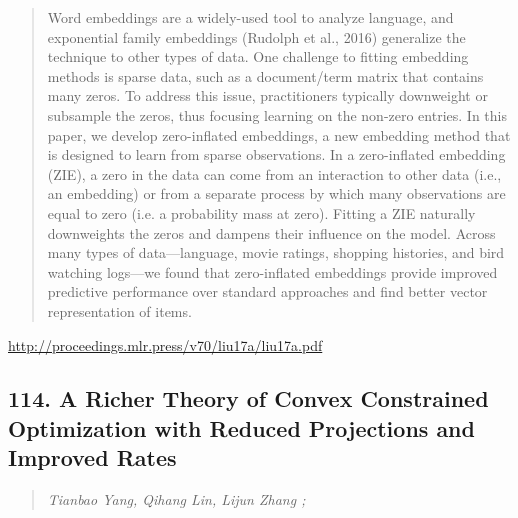 \documentclass{article}
\begin{document}
\begin{quote}
    Word embeddings are a widely-used tool to analyze language, and exponential family embeddings (Rudolph et al., 2016) generalize the technique to other types of data. One challenge to fitting embedding methods is sparse data, such as a document/term matrix that contains many zeros. To address this issue, practitioners typically downweight or subsample the zeros, thus focusing learning on the non-zero entries. In this paper, we develop zero-inflated embeddings, a new embedding method that is designed to learn from sparse observations. In a zero-inflated embedding (ZIE), a zero in the data can come from an interaction to other data (i.e., an embedding) or from a separate process by which many observations are equal to zero (i.e. a probability mass at zero). Fitting a ZIE naturally downweights the zeros and dampens their influence on the model. Across many types of data—language, movie ratings, shopping histories, and bird watching logs—we found that zero-inflated embeddings provide improved predictive performance over standard approaches and find better vector representation of items.  
\end{quote}

\href{http://proceedings.mlr.press/v70/liu17a/liu17a.pdf}{http://proceedings.mlr.press/v70/liu17a/liu17a.pdf}

\subsection{114. A Richer Theory of Convex Constrained Optimization with Reduced Projections and Improved Rates}

\begin{quote}
\footnotesize{\textit{Tianbao Yang, Qihang Lin, Lijun Zhang ;}}

\end{quote}
\end{document}
